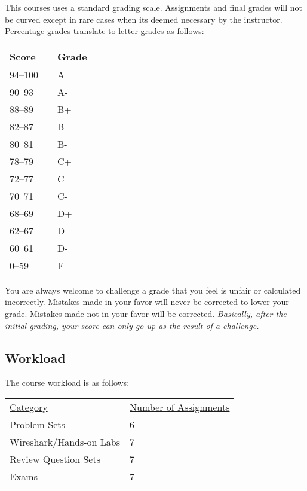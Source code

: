 \documentclass[10pt]{article}
\begin{document}
This courses uses a standard grading scale.  Assignments and final grades will not be curved except in rare cases when its deemed necessary by the instructor.  Percentage grades translate to letter grades as follows:

\begin{center}
\begin{small}
\begin{tabular}{lcl}
Score & & Grade \\ \toprule
94--100 & & A \\
90--93 & & A- \\
88--89 & & B+ \\
82--87 & & B \\
80--81 & & B- \\
78--79 & & C+ \\
72--77 & & C \\
70--71 & & C- \\
68--69 & & D+ \\
62--67 & & D \\
60--61 & & D- \\
0--59 & & F
\end{tabular}
\end{small}
\end{center}


You are always welcome to challenge a grade that you feel is unfair or calculated incorrectly.  Mistakes made in your favor will never be corrected to lower your grade.  Mistakes made not in your favor will be corrected.  \textit{Basically, after the initial grading, your score can only go up as the result of a challenge.}

\subsection{Workload}

The course workload is as follows:
\begin{center}
  \begin{tabular}{ll}
    \underline{Category} & \underline{Number of Assignments} \\
    Problem Sets & 6 \\
    Wireshark/Hands-on Labs & 7 \\
    Review Question Sets & 7 \\
    Exams & 7 \\
  \end{tabular}
\end{center}
\end{document}
